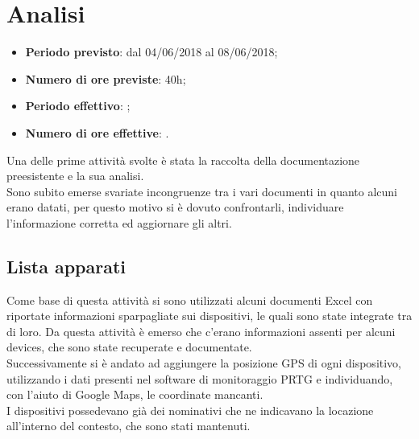 \documentclass[Realizzazione.tex]{subfiles}
\begin{document}
\section{Analisi}

\begin{itemize}
	\item \textbf{Periodo previsto}: dal 04/06/2018 al 08/06/2018;
	\item \textbf{Numero di ore previste}: 40h;
	\item \textbf{Periodo effettivo}: ;
	\item \textbf{Numero di ore effettive}: .
\end{itemize}

Una delle prime attività svolte è stata la raccolta della documentazione preesistente e la sua analisi. \\
Sono subito emerse svariate incongruenze tra i vari documenti in quanto alcuni erano datati, per questo motivo si è dovuto confrontarli, individuare l'informazione corretta ed aggiornare gli altri. \\

\subsection{Lista apparati}
Come base di questa attività si sono utilizzati alcuni documenti Excel con riportate informazioni sparpagliate sui dispositivi, le quali sono state integrate tra di loro. Da questa attività è emerso che c'erano informazioni assenti per alcuni devices, che sono state recuperate e documentate. \\
Successivamente si è andato ad aggiungere la posizione GPS di ogni dispositivo, utilizzando i dati presenti nel software di monitoraggio PRTG e individuando, con l'aiuto di Google Maps, le coordinate mancanti. \\
I dispositivi possedevano già dei nominativi che ne indicavano la locazione all'interno del contesto, che sono stati mantenuti. \\
\end{document}
